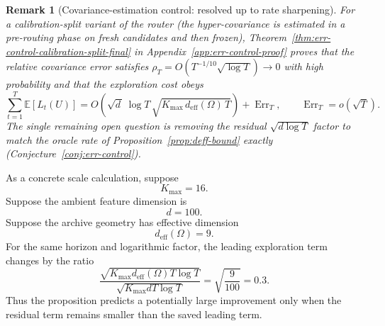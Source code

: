 \documentclass{article} %
\newtheorem{remark}{Remark}
\begin{document}
\begin{remark}[Covariance-estimation control: resolved up to rate sharpening]
For a calibration-split variant of the router (the hyper-covariance is estimated in a pre-routing phase on fresh candidates and then frozen), Theorem~\ref{thm:err-control-calibration-split-final} in Appendix~\ref{app:err-control-proof} proves that the relative covariance error satisfies $\rho_T = O(T^{-1/10}\sqrt{\log T}) \to 0$ with high probability and that the exploration cost obeys
\begin{equation}
\label{eq:hyper-open-err}
\sum_{t=1}^{T}\mathbb{E}[L_t(U)]
= O\!\left(\sqrt{d\,}\,\log T\,\sqrt{K_{\max}\,d_{\mathrm{eff}}(\Omega)\,T}\right)
+ \operatorname{Err}_T, \qquad \operatorname{Err}_T = o(\sqrt{T}).
\end{equation}
The single remaining open question is removing the residual $\sqrt{d\log T}$ factor to match the oracle rate of Proposition~\ref{prop:deff-bound} exactly (Conjecture~\ref{conj:err-control}).
\end{remark}

As a concrete scale calculation, suppose
\begin{equation}
\label{eq:hyper-example-k}
K_{\max}=16.
\end{equation}
Suppose the ambient feature dimension is
\begin{equation}
\label{eq:hyper-example-d}
d=100.
\end{equation}
Suppose the archive geometry has effective dimension
\begin{equation}
\label{eq:hyper-example-deff}
d_{\mathrm{eff}}(\Omega)=9.
\end{equation}
For the same horizon and logarithmic factor, the leading exploration term changes by the ratio
\begin{equation}
\label{eq:hyper-example-ratio}
\frac{
\sqrt{K_{\max}d_{\mathrm{eff}}(\Omega)T\log T}
}{
\sqrt{K_{\max}dT\log T}
}
=
\sqrt{\frac{9}{100}}
=
0.3.
\end{equation}
Thus the proposition predicts a potentially large improvement only when the residual term remains smaller than the saved leading term.
\end{document}
